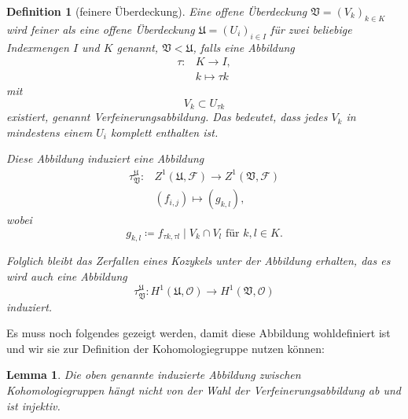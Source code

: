 \documentclass[11pt,a4paper,toc=bibliography]{scrartcl}
\theoremstyle{thm}
\newtheorem{lemma}{Lemma}[section]
\theoremstyle{def}
\newtheorem{defi}{Definition}[section]
\theoremstyle{remark}
\begin{document}
\begin{defi}[feinere Überdeckung]
Eine offene Überdeckung $\mathfrak{V}=(V_k)_{k\in K}$ wird \emph{feiner} als eine offene Überdeckung $\mathfrak{U}=(U_i)_{i\in I}$ für zwei beliebige Indexmengen $I$ und $K$ genannt, $\mathfrak{V}<\mathfrak{U}$, falls eine Abbildung 
\begin{align*}
\tau: & K\rightarrow I,\\
	  & k\mapsto \tau k
\end{align*}
mit
\[
V_{k}\subset U_{\tau k}
\]
existiert, genannt \emph{Verfeinerungsabbildung}. Das bedeutet, dass jedes $V_k$ in mindestens einem $U_i$ komplett enthalten ist.

Diese Abbildung induziert eine Abbildung
\begin{align*}
\tau_{\mathfrak{V}}^{\mathfrak{U}}:& Z^1(\mathfrak{U},\mathcal{F})\rightarrow Z^1(\mathfrak{V},\mathcal{F})\\
&(f_{i,j})\mapsto (g_{k,l}),
\end{align*}
wobei 
\[
g_{k,l} \coloneqq  f_{\tau k,\tau l}\mid V_k\cap V_l\text{ für } k,l\in K.
\]

Folglich bleibt das Zerfallen eines Kozykels unter der Abbildung erhalten, das es wird auch eine Abbildung 
\[
\tau_{\mathfrak{V}}^{\mathfrak{U}}:H^1(\mathfrak{U},\mathcal{O})\rightarrow H^1(\mathfrak{V},\mathcal{O})
\]
induziert.
\end{defi}
Es muss noch folgendes gezeigt werden, damit diese Abbildung wohldefiniert ist und wir sie zur Definition der Kohomologiegruppe nutzen können:
\begin{lemma}
Die oben genannte induzierte Abbildung zwischen Kohomologiegruppen  hängt nicht von der Wahl der Verfeinerungsabbildung ab und ist injektiv.
\end{lemma}
\end{document}

